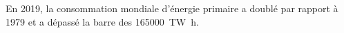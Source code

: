 En 2019, la consommation mondiale d'énergie primaire a doublé par rapport à 1979 et a dépassé la barre des \qty{165000}{\tera \watt \hour}.
